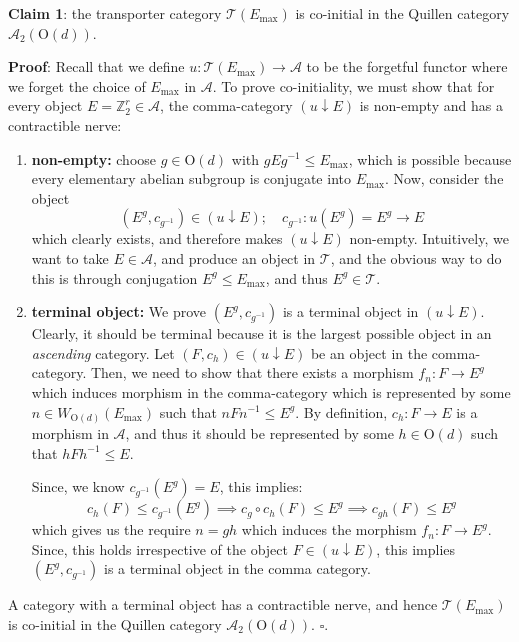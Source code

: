 \documentclass[aps,prx,reprint,superscriptaddress,twocolumn,amsmath,amssymb,amsfonts, nofootinbib]{revtex4-2}
\theoremstyle{apsstyle}
\begin{document}
\bigskip 

\noindent \textbf{Claim 1}: the transporter category $\mathcal{T}(E_{\mathrm{max}})$ is co-initial in the Quillen category $\mathcal{A}_{2}(\mathrm{O}(d))$. 

\noindent \textbf{Proof}: Recall that we define $u: \mathcal{T}(E_{\mathrm{max}}) \to \mathcal{A}$ to be the forgetful functor where we forget the choice of $E_{\mathrm{max}}$ in $\mathcal{A}$. To prove co-initiality, we must show that for every object $E=\mathbb{Z}_{2}^{r}\in \mathcal{A}$, the comma-category $(u\downarrow E)$ is non-empty and has a contractible nerve:

\begin{enumerate}
    \item \textbf{non-empty:} choose $g\in \mathrm{O}(d)$ with $gEg^{-1}\leq E_{\mathrm{max}}$, which is possible because every elementary abelian subgroup is conjugate into $E_{\mathrm{max}}$. Now, consider the object $$
(E^{g}, c_{g^{-1}})\in (u\downarrow E);\quad c_{g^{-1}}: u(E^{g})=E^{g} \to E
$$which clearly exists, and therefore makes $(u\downarrow E)$ non-empty. Intuitively, we want to take $E\in \mathcal{A}$, and produce an object in $\mathcal{T}$, and the obvious way to do this is through conjugation $E^{g}\leq E_{\mathrm{max}}$, and thus $E^{g}\in \mathcal{T}$.
    \item \textbf{terminal object:} We prove $(E^{g}, c_{g^{-1}})$ is a terminal object in $(u\downarrow E)$. Clearly, it should be terminal because it is the largest possible object in an \textit{ascending} category. Let $(F, c_{h})\in(u\downarrow E)$ be an object in the comma-category. Then, we need to show that there exists a morphism $f_{n}: F \to E^{g}$ which induces morphism in the comma-category which is represented by some $n\in W_{\mathrm{O}(d)}(E_{\mathrm{max}})$ such that $nFn^{-1}\leq E^{g}$. 
   By definition, $c_{h}: F \to E$ is a morphism in $\mathcal{A}$, and thus it should be represented by some $h\in \mathrm{O}(d)$ such that $hFh^{-1} \leq E$. 
   
   Since, we know $c_{g^{-1}}(E^{g})=E$, this implies: $$
c_{h}(F)\leq c_{g^{-1}}(E^{g})\implies c_{g}\circ c_{h}(F)\leq E^{g}\implies c_{gh}(F)\leq E^{g}
$$which gives us the require $n=gh$ which induces the morphism $f_{n}:F \to E^{g}$. Since, this holds irrespective of the object $F\in (u\downarrow E)$, this implies $(E^{g}, c_{g^{-1}})$ is a terminal object in the comma category.
\end{enumerate}

\noindent A category with a terminal object has a contractible nerve, and hence $\mathcal{T}(E_{\mathrm{max}})$ is co-initial in the Quillen category $\mathcal{A}_{2}(\mathrm{O}(d))$.
$\square$.
\end{document}
